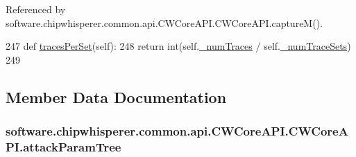 Referenced by software.\+chipwhisperer.\+common.\+api.\+C\+W\+Core\+A\+P\+I.\+C\+W\+Core\+A\+P\+I.\+capture\+M().


\begin{DoxyCode}
247     \textcolor{keyword}{def }\hyperlink{classsoftware_1_1chipwhisperer_1_1common_1_1api_1_1CWCoreAPI_1_1CWCoreAPI_acf30a1f42698176fe07692ae548b87f9}{tracesPerSet}(self):
248         \textcolor{keywordflow}{return} int(self.\hyperlink{classsoftware_1_1chipwhisperer_1_1common_1_1api_1_1CWCoreAPI_1_1CWCoreAPI_a46b07fbe99164a89bc2fda38e7299805}{\_numTraces} / self.\hyperlink{classsoftware_1_1chipwhisperer_1_1common_1_1api_1_1CWCoreAPI_1_1CWCoreAPI_a1c721211486a7a52491e7a4feccaee3d}{\_numTraceSets})
249 
\end{DoxyCode}


\subsection{Member Data Documentation}
\hypertarget{classsoftware_1_1chipwhisperer_1_1common_1_1api_1_1CWCoreAPI_1_1CWCoreAPI_aae05653ed5368316d299c983d912d992}{}
\subsubsection[{attack\+Param\+Tree}]{\setlength{\rightskip}{0pt plus 5cm}software.\+chipwhisperer.\+common.\+api.\+C\+W\+Core\+A\+P\+I.\+C\+W\+Core\+A\+P\+I.\+attack\+Param\+Tree}\label{classsoftware_1_1chipwhisperer_1_1common_1_1api_1_1CWCoreAPI_1_1CWCoreAPI_aae05653ed5368316d299c983d912d992}
\hypertarget{classsoftware_1_1chipwhisperer_1_1common_1_1api_1_1CWCoreAPI_1_1CWCoreAPI_a261dbca889630e7c30fe29720e84e7ea}{}
